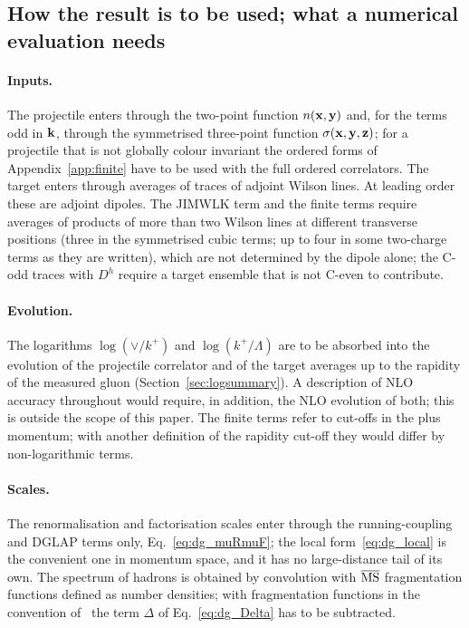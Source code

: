 \subsection{How the result is to be used; what a numerical evaluation needs}\label{sec:disc_use}

\paragraph{Inputs.} The projectile enters through the two-point function $n(\mathbf{x},\mathbf{y})$ and, for the terms odd in $\mathbf{k}$, through the symmetrised three-point function $\sigma(\mathbf{x},\mathbf{y},\mathbf{z})$; for a projectile that is not globally colour invariant the ordered forms of Appendix~\ref{app:finite} have to be used with the full ordered correlators. The target enters through averages of traces of adjoint Wilson lines. At leading order these are adjoint dipoles. The JIMWLK term and the finite terms require averages of products of more than two Wilson lines at different transverse positions (three in the symmetrised cubic terms; up to four in some two-charge terms as they are written), which are not determined by the dipole alone; the C-odd traces with $D^h$ require a target ensemble that is not C-even to contribute.

\paragraph{Evolution.} The logarithms $\log(\vee/k^+)$ and $\log(k^+/\Lambda)$ are to be absorbed into the evolution of the projectile correlator and of the target averages up to the rapidity of the measured gluon (Section~\ref{sec:logsummary}). A description of NLO accuracy throughout would require, in addition, the NLO evolution of both; this is outside the scope of this paper. The finite terms refer to cut-offs in the plus momentum; with another definition of the rapidity cut-off they would differ by non-logarithmic terms.

\paragraph{Scales.} The renormalisation and factorisation scales enter through the running-coupling and DGLAP terms only, Eq.~\eqref{eq:dg_muRmuF}; the local form~\eqref{eq:dg_local} is the convenient one in momentum space, and it has no large-distance tail of its own. The spectrum of hadrons is obtained by convolution with $\overline{\rm MS}$ fragmentation functions defined as number densities; with fragmentation functions in the convention of~\cite{Chirilli:2012jd} the term $\Delta$ of Eq.~\eqref{eq:dg_Delta} has to be subtracted.

